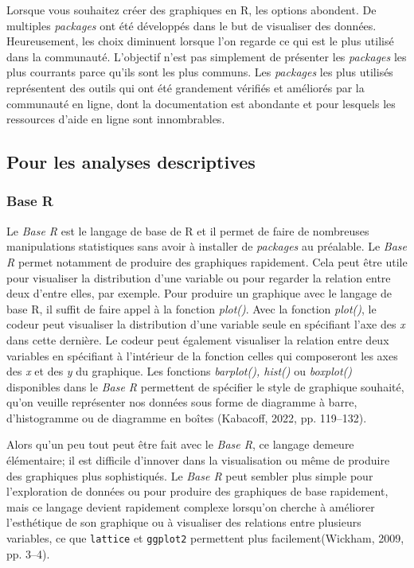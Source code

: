 \documentclass[
  letterpaper,
  DIV=11,
  numbers=noendperiod]{scrreprt}
\begin{document}
Lorsque vous souhaitez créer des graphiques en R, les options abondent.
De multiples \emph{packages} ont été développés dans le but de
visualiser des données. Heureusement, les choix diminuent lorsque l'on
regarde ce qui est le plus utilisé dans la communauté. L'objectif n'est
pas simplement de présenter les \emph{packages} les plus courrants parce
qu'ils sont les plus communs. Les \emph{packages} les plus utilisés
représentent des outils qui ont été grandement vérifiés et améliorés par
la communauté en ligne, dont la documentation est abondante et pour
lesquels les ressources d'aide en ligne sont innombrables.

\hypertarget{pour-les-analyses-descriptives}{%
\subsection{Pour les analyses
descriptives}\label{pour-les-analyses-descriptives}}

\hypertarget{base-r}{%
\subsubsection{Base R}\label{base-r}}

Le \emph{Base R} est le langage de base de R et il permet de faire de
nombreuses manipulations statistiques sans avoir à installer de
\emph{packages} au préalable. Le \emph{Base R} permet notamment de
produire des graphiques rapidement. Cela peut être utile pour visualiser
la distribution d'une variable ou pour regarder la relation entre deux
d'entre elles, par exemple. Pour produire un graphique avec le langage
de base R, il suffit de faire appel à la fonction \emph{plot()}. Avec la
fonction \emph{plot()}, le codeur peut visualiser la distribution d'une
variable seule en spécifiant l'axe des \emph{x} dans cette dernière. Le
codeur peut également visualiser la relation entre deux variables en
spécifiant à l'intérieur de la fonction celles qui composeront les axes
des \emph{x} et des \emph{y} du graphique. Les fonctions
\emph{barplot(), hist()} ou \emph{boxplot()} disponibles dans le
\emph{Base R} permettent de spécifier le style de graphique souhaité,
qu'on veuille représenter nos données sous forme de diagramme à barre,
d'histogramme ou de diagramme en boîtes (Kabacoff, 2022, pp. 119--132).

Alors qu'un peu tout peut être fait avec le \emph{Base R}, ce langage
demeure élémentaire; il est difficile d'innover dans la visualisation ou
même de produire des graphiques plus sophistiqués. Le \emph{Base R} peut
sembler plus simple pour l'exploration de données ou pour produire des
graphiques de base rapidement, mais ce langage devient rapidement
complexe lorsqu'on cherche à améliorer l'esthétique de son graphique ou
à visualiser des relations entre plusieurs variables, ce que
\texttt{lattice} et \texttt{ggplot2} permettent plus facilement(Wickham,
2009, pp. 3--4).
\end{document}
